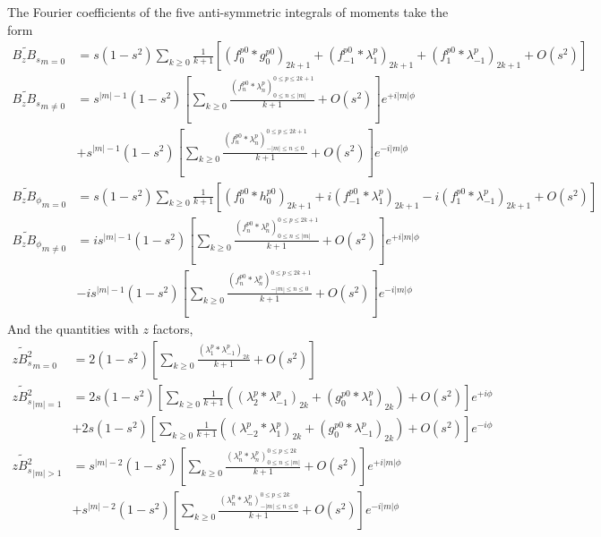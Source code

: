 \documentclass[a4paper, 11pt]{article}
\begin{document}
The Fourier coefficients of the five anti-symmetric integrals of moments take the form
\begin{equation}
\begin{aligned}
    \widetilde{B_z B_s}_{m=0} &= s \left(1 - s^2\right) \sum_{k\geq 0}\frac{1}{k+1}\left[(f_0^{p0}*g_0^{p0})_{2k+1} + (f_{-1}^{p0} * \lambda_{1}^p)_{2k+1} + (f_{1}^{p0} * \lambda_{-1}^p)_{2k+1} + O\left(s^2\right)\right] \\ 
    \widetilde{B_z B_s}_{m\neq 0} &= s^{|m|-1} \left(1 - s^2\right) \left[\sum_{k\geq 0} \frac{(f_n^{p0} * \lambda_n^p)_{0\leq n \leq |m|}^{0\leq p \leq 2k+1}}{k+1} + O\left(s^2\right)\right] e^{+i|m|\phi} \\ 
    &+ s^{|m|-1} \left(1 - s^2\right) \left[\sum_{k\geq 0} \frac{(f_n^{p0} * \lambda_n^p)_{-|m| \leq n \leq 0}^{0\leq p \leq 2k+1}}{k+1} + O\left(s^2\right)\right] e^{-i|m|\phi} \\ 
    \widetilde{B_z B_\phi}_{m=0} &= s \left(1 - s^2\right) \sum_{k\geq 0}\frac{1}{k+1}\left[(f_0^{p0}*h_0^{p0})_{2k+1} + i(f_{-1}^{p0} * \lambda_{1}^p)_{2k+1} - i(f_{1}^{p0} * \lambda_{-1}^p)_{2k+1} + O\left(s^2\right)\right] \\ 
    \widetilde{B_z B_\phi}_{m\neq 0} &= i s^{|m|-1} \left(1 - s^2\right) \left[\sum_{k\geq 0} \frac{(f_n^{p0} * \lambda_n^p)_{0\leq n \leq |m|}^{0\leq p \leq 2k+1}}{k+1} + O\left(s^2\right)\right] e^{+i|m|\phi} \\ 
    &-i s^{|m|-1} \left(1 - s^2\right) \left[\sum_{k\geq 0} \frac{(f_n^{p0} * \lambda_n^p)_{-|m| \leq n \leq 0}^{0\leq p \leq 2k+1}}{k+1} + O\left(s^2\right)\right] e^{-i|m|\phi}
\end{aligned}
\end{equation}
And the quantities with $z$ factors,
\begin{equation}
    \begin{aligned}
        \widetilde{zB_s^2}_{m=0} &= 2\left(1 - s^2\right) \left[\sum_{k\geq 0} \frac{(\lambda_1^p * \lambda_{-1}^p)_{2k}}{k+1} + O\left(s^2\right)\right] \\ 
        \widetilde{zB_s^2}_{|m|=1} &= 2 s \left(1 - s^2\right) \left[\sum_{k\geq 0} \frac{1}{k+1} \left((\lambda_2^p * \lambda_{-1}^p)_{2k} + (g_0^{p0} * \lambda_{1}^p)_{2k}\right) + O\left(s^2\right)\right] e^{+i\phi} \\ 
        &+ 2 s \left(1 - s^2\right) \left[\sum_{k\geq 0} \frac{1}{k+1} \left((\lambda_{-2}^p * \lambda_{1}^p)_{2k} + (g_0^{p0} * \lambda_{-1}^p)_{2k}\right) + O\left(s^2\right)\right] e^{-i\phi} \\
        \widetilde{zB_s^2}_{|m|>1} &= s^{|m|-2} \left(1 - s^2\right) \left[\sum_{k\geq 0} \frac{(\lambda_n^p * \lambda_{n}^p)_{0\leq n \leq |m|}^{0\leq p \leq 2k}}{k+1} + O\left(s^2\right)\right] e^{+i|m|\phi} \\ 
        &+ s^{|m|-2} \left(1 - s^2\right) \left[\sum_{k\geq 0} \frac{(\lambda_n^p * \lambda_{n}^p)_{-|m|\leq n \leq 0}^{0\leq p \leq 2k}}{k+1} + O\left(s^2\right)\right] e^{-i|m|\phi}
    \end{aligned}
\end{equation}
\end{document}
